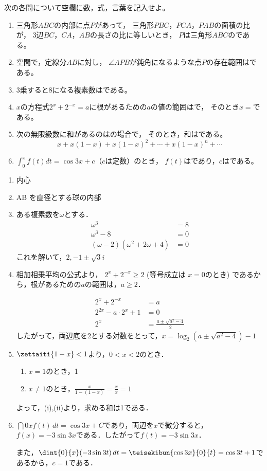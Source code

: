 \begin{problem}
  次の各問について空欄に数，式，言葉を記入せよ。
\begin{enumerate}
\item 三角形$ABC$の内部に点$P$があって，
三角形$PBC$，$PCA$，$PAB$の面積の比が，
3辺$BC$，$CA$，$AB$の長さの比に等しいとき，
$P$は三角形$ABC$の\HAKO である。
\item 空間で，定線分$AB$に対し，
$\angle APB$が鈍角になるような点$P$の存在範囲は\HAKO である。
\item 3乗すると8になる複素数は\HAKO である。
\item $x$の方程式$2^x+2^{-x}=a$に根があるための$a$の値の範囲は\HAKO で，
そのとき$x=$\HAKO である。
\item 次の無限級数に和があるのは\HAKO の場合で，
そのとき，和は\HAKO である。
\[ x+x(1-x)+x{(1-x)}^2+\cdots+x{(1-x)}^n+\cdots \]
\item $\displaystyle\int_0^xf(t)dt=\cos3x+c$（$c$は定数）のとき，
$f(t)$は\HAKO であり，$c$は\HAKO である。
\end{enumerate}
\end{problem}

\begin{enumerate}
  \item {}\qquad 内心
  \item {}\qquad AB を直径とする球の内部
  \item ある複素数を$\omega$とする．
  \begin{align*}
    \omega^3 &= 8 \\
    \omega^3-8 &= 0 \\
    (\omega-2)(\omega^2+2\omega+4) &= 0
  \end{align*}
  これを解いて，\qquad $2, -1\pm\sqrt3 i$
  \item 相加相乗平均の公式より，
  $2^x + 2^{-x} \geq 2$ (等号成立は $x=0$のとき) であるから，根があるための$a$の範囲は，\qquad $a\geq 2$．

  \begin{align*}
    2^x + 2^{-x} &= a \\
    2^{2x} - a \cdot 2^x + 1 &= 0\\
    2^x &= \frac{a\pm \sqrt{a^2-4}}{2}
  \end{align*}
  したがって，両辺底を2とする対数をとって，\qquad $x = \log_2\left( a\pm \sqrt{a^2-4} \right) -1$

  \item $\zettaiti{1-x} < 1$より，\qquad $0<x<2$のとき．
  \begin{enumerate}
    \item $x=1$のとき，1
    \item $x\neq1$のとき，$\frac{x}{1-(1-x)} = \frac{x}{x} = 1$
  \end{enumerate}
  よって，(i),(ii)より，求める和は\qquad 1である．

  \item $\dint{0}{x}f(t)\,dt = \cos 3x + C$であり，両辺を$x$で微分すると，$f(x) = -3\sin 3x$である．したがって\qquad $f(t) = -3 \sin 3x$．

  また，$\dint{0}{x}(-3\sin 3t)\,dt = \teisekibun{\cos 3x}{0}{t} = \cos 3t+1$であるから，\qquad $c=1$である．
\end{enumerate}
